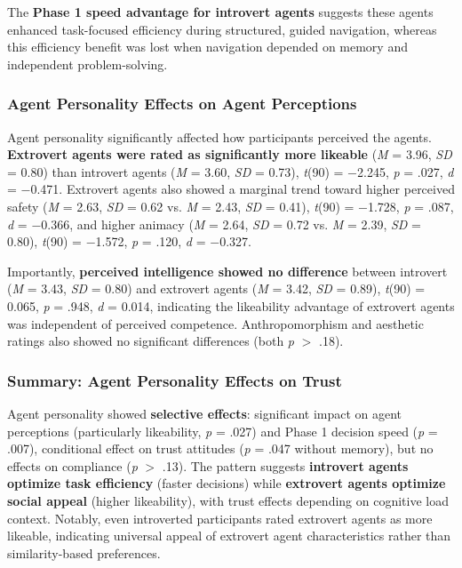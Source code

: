 \documentclass[12pt]{article}
\begin{document}
The \textbf{Phase 1 speed advantage for introvert agents} suggests these agents enhanced task-focused efficiency during structured, guided navigation, whereas this efficiency benefit was lost when navigation depended on memory and independent problem-solving.

\subsubsection{Agent Personality Effects on Agent Perceptions}

Agent personality significantly affected how participants perceived the agents. \textbf{Extrovert agents were rated as significantly more likeable} (\textit{M} = 3.96, \textit{SD} = 0.80) than introvert agents (\textit{M} = 3.60, \textit{SD} = 0.73), \textit{t}(90) = $-$2.245, \textit{p} = .027, \textit{d} = $-$0.471. Extrovert agents also showed a marginal trend toward higher perceived safety (\textit{M} = 2.63, \textit{SD} = 0.62 vs. \textit{M} = 2.43, \textit{SD} = 0.41), \textit{t}(90) = $-$1.728, \textit{p} = .087, \textit{d} = $-$0.366, and higher animacy (\textit{M} = 2.64, \textit{SD} = 0.72 vs. \textit{M} = 2.39, \textit{SD} = 0.80), \textit{t}(90) = $-$1.572, \textit{p} = .120, \textit{d} = $-$0.327.

Importantly, \textbf{perceived intelligence showed no difference} between introvert (\textit{M} = 3.43, \textit{SD} = 0.80) and extrovert agents (\textit{M} = 3.42, \textit{SD} = 0.89), \textit{t}(90) = 0.065, \textit{p} = .948, \textit{d} = 0.014, indicating the likeability advantage of extrovert agents was independent of perceived competence. Anthropomorphism and aesthetic ratings also showed no significant differences (both \textit{p} $>$ .18).

\subsubsection{Summary: Agent Personality Effects on Trust}

Agent personality showed \textbf{selective effects}: significant impact on agent perceptions (particularly likeability, \textit{p} = .027) and Phase 1 decision speed (\textit{p} = .007), conditional effect on trust attitudes (\textit{p} = .047 without memory), but no effects on compliance (\textit{p} $>$ .13). The pattern suggests \textbf{introvert agents optimize task efficiency} (faster decisions) while \textbf{extrovert agents optimize social appeal} (higher likeability), with trust effects depending on cognitive load context. Notably, even introverted participants rated extrovert agents as more likeable, indicating universal appeal of extrovert agent characteristics rather than similarity-based preferences.
\end{document}
